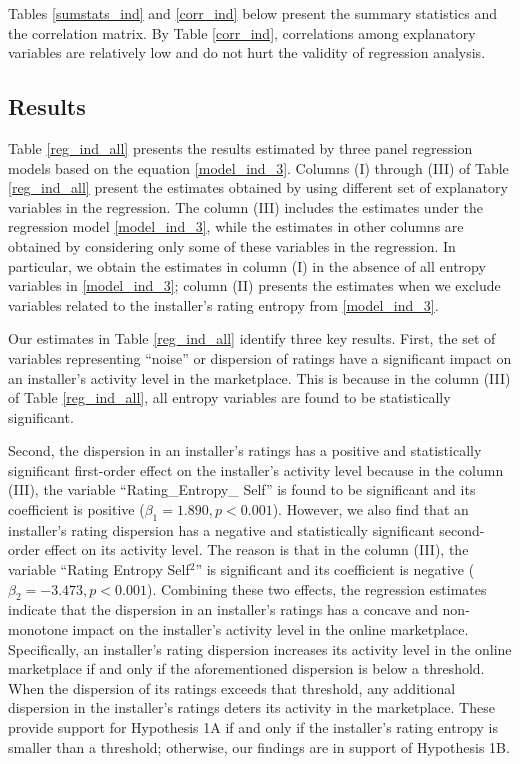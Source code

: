 \documentclass[msom,blindrev]{informs3}
\begin{document}
Tables \ref{sumstats_ind} and \ref{corr_ind} below present the summary statistics and the correlation matrix. By Table \ref{corr_ind}, correlations among explanatory variables are relatively low and do not hurt the validity of regression analysis.





\subsection{Results}

Table \ref{reg_ind_all} presents the results estimated by three panel regression models based on the equation \eqref{model_ind_3}. Columns (I) through (III) of Table \ref{reg_ind_all} present the estimates obtained by using different set of explanatory variables in the regression. The column (III) includes the estimates under the regression model \eqref{model_ind_3}, while the estimates in other columns are obtained by considering only some of these variables in the regression. In particular, we obtain the estimates in column (I) in the absence of all entropy variables in \eqref{model_ind_3}; column (II) presents the estimates when we exclude variables related to the installer's rating entropy from \eqref{model_ind_3}.




Our estimates in Table \ref{reg_ind_all} identify three key results. First, the set of variables representing ``noise'' or dispersion of ratings have a significant impact on an installer's activity level in the marketplace. This is because in the column (III) of Table \ref{reg_ind_all}, all entropy variables are found to be statistically significant.

Second, the dispersion in an installer's ratings has a positive and statistically significant first-order effect on the installer's activity level because in the column (III), the variable ``Rating\_Entropy\_ Self'' is found to be significant and its coefficient is positive ($\beta_{1} = 1.890,p<0.001$). However, we also find that an installer's rating dispersion has a negative and statistically significant second-order effect on its activity level. The reason is that in the column (III), the variable ``Rating Entropy Self$^2$'' is significant and its coefficient is negative ($\beta_{2} = -3.473, p<0.001$). Combining these two effects, the regression estimates indicate that the dispersion in an installer's ratings has a concave and non-monotone impact on the installer's activity level in the online marketplace. Specifically,  an installer's rating dispersion increases its activity level in the online marketplace if and only if the aforementioned dispersion is below a threshold. When the dispersion of its ratings exceeds that threshold, any additional dispersion in the installer's ratings deters its activity in the marketplace. These provide support for Hypothesis 1A if and only if the installer's rating entropy is smaller than a threshold; otherwise, our findings are in support of Hypothesis 1B.
\end{document}
